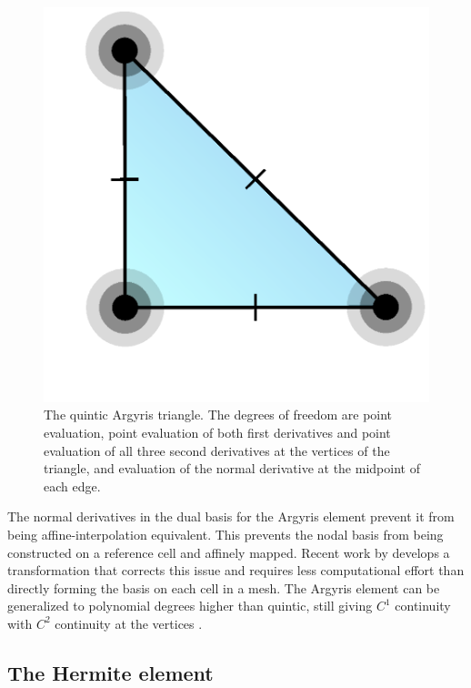 \begin{figure}
  \begin{center}
    \includegraphics[width=\elmfigsizesingle]{chapters/kirby-6/png/ARG5_2d.png}
    \caption{The quintic Argyris triangle. The degrees of freedom are
      point evaluation, point evaluation of both first derivatives and
      point evaluation of all three second derivatives at the vertices
      of the triangle, and evaluation of the normal derivative at the
      midpoint of each edge.}
  \end{center}
  \label{kirby-6:fig:argyris}
\end{figure}

The normal derivatives in the dual basis for the Argyris element
prevent it from being affine-interpolation equivalent. This prevents
the nodal basis from being constructed on a reference cell and
affinely mapped. Recent work by \citet{DominguezSayas2008} develops a
transformation that corrects this issue and requires less
computational effort than directly forming the basis on each cell in a
mesh. The Argyris element can be generalized to polynomial degrees
higher than quintic, still giving \( C^1 \) continuity with \( C^2 \)
continuity at the vertices \citep{SolinSegethDolevzel2004}.

\subsection{The Hermite element}

